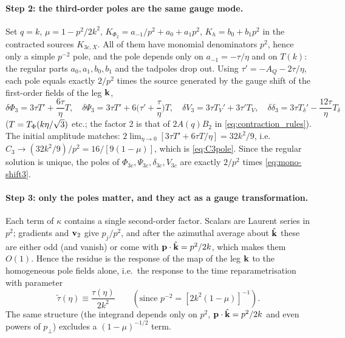 \paragraph{Step 2: the third-order poles are the same gauge mode.}  Set $q=k$, $\mu=1-p^2/2k^2$, $K_{\Phi_2}=a_{-1}/p^2+a_0+a_1p^2$, $K_h=b_0+b_1p^2$ in the
contracted sources $K_{3c,X}$.  All of them have monomial denominators $p^2$, hence only a simple $p^{-2}$ pole, and the pole depends only on
$a_{-1}=-\tau/\eta$ and on $T(k)$: the regular parts $a_0,a_1,b_0,b_1$ and the tadpoles drop out.  Using $\tau'=-A_Q-2\tau/\eta$, each pole equals exactly
$2/p^2$ times the source generated by the gauge shift of the first-order fields of the leg $\mathbf k$,
\begin{equation}
\delta\Phi_3=3\tau T'+\frac{6\tau}\eta T,\quad \delta\Psi_3=3\tau T'+6\Big(\tau'+\frac\tau\eta\Big)T,\quad
\delta V_3=3\tau T_V'+3\tau'T_V,\quad \delta\delta_3=3\tau T_\delta'-\frac{12\tau}\eta T_\delta
\label{eq:mono-shift3}
\end{equation}
($T=T_\Phi(k\eta/\sqrt3)$ etc.; the factor 2 is that of $2A(q)B_2$ in \eqref{eq:contraction_rules}).  The initial amplitude matches:
$2\lim_{\eta\to0}[3\tau T'+6\tau T/\eta]=32k^2/9$, i.e.\ $C_3\to(32k^2/9)/p^2=16/[9(1-\mu)]$, which is \eqref{eq:C3pole}.  Since the regular solution
is unique, the poles of $\Phi_{3c},\Psi_{3c},\delta_{3c},V_{3c}$ are exactly $2/p^2$ times \eqref{eq:mono-shift3}.

\paragraph{Step 3: only the poles matter, and they act as a gauge transformation.}  Each term of $\kappa$ contains a single second-order factor.
Scalars are Laurent series in $p^2$; gradients and $\mathbf v_2$ give $p_j/p^2$, and after the azimuthal average about $\hat{\mathbf k}$ these are either odd (and
vanish) or come with $\mathbf p\cdot\hat{\mathbf k}=p^2/2k$, which makes them $O(1)$.  Hence the residue is the response of the map of the leg $\mathbf k$ to the
homogeneous pole fields alone, i.e.\ the response to the time reparametrisation with parameter
\begin{equation}
\tilde\tau(\eta)\equiv\frac{\tau(\eta)}{2k^2}\qquad(\text{since }p^{-2}=[2k^2(1-\mu)]^{-1}).
\end{equation}
The same structure (the integrand depends only on $p^2$, $\mathbf p\cdot\hat{\mathbf k}=p^2/2k$ and even powers of $p_\perp$) excludes a $(1-\mu)^{-1/2}$ term.

